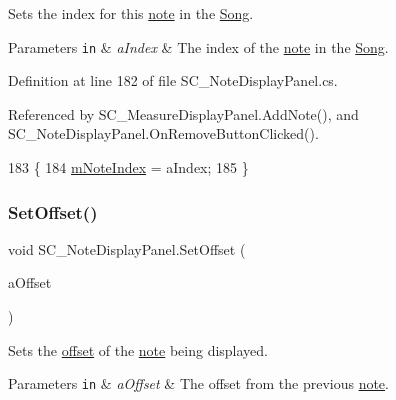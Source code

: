 Sets the index for this \hyperlink{group___music_structs_struct_music_1_1_combined_note}{note} in the \hyperlink{class_song}{Song}. 


\begin{DoxyParams}[1]{Parameters}
\mbox{\tt in}  & {\em a\+Index} & The index of the \hyperlink{group___music_structs_struct_music_1_1_combined_note}{note} in the \hyperlink{class_song}{Song}. \\
\hline
\end{DoxyParams}


Definition at line 182 of file S\+C\+\_\+\+Note\+Display\+Panel.\+cs.



Referenced by S\+C\+\_\+\+Measure\+Display\+Panel.\+Add\+Note(), and S\+C\+\_\+\+Note\+Display\+Panel.\+On\+Remove\+Button\+Clicked().


\begin{DoxyCode}
183     \{
184         \hyperlink{group___s_c___n_d_p_priv_var_ga11933919195aba904a4e8bf95f131e49}{mNoteIndex} = aIndex;
185     \}
\end{DoxyCode}
\mbox{\label{group___s_c___n_d_p_unity_ga8ff7588e8c3f59a03842feaff92f97e9}} 
\subsubsection{\texorpdfstring{Set\+Offset()}{SetOffset()}}
{\footnotesize\ttfamily void S\+C\+\_\+\+Note\+Display\+Panel.\+Set\+Offset (\begin{DoxyParamCaption}\item[{\hyperlink{group___music_enums_gaf11b5f079adbb21c800b9eca1c5c3cbd}{Music.\+N\+O\+T\+E\+\_\+\+L\+E\+N\+G\+TH}}]{a\+Offset }\end{DoxyParamCaption})}



Sets the \hyperlink{group___music_structs_ae281187907aed4c728c7981300dbebaf}{offset} of the \hyperlink{group___music_structs_struct_music_1_1_combined_note}{note} being displayed. 


\begin{DoxyParams}[1]{Parameters}
\mbox{\tt in}  & {\em a\+Offset} & The offset from the previous \hyperlink{group___music_structs_struct_music_1_1_combined_note}{note}. \\
\hline
\end{DoxyParams}


